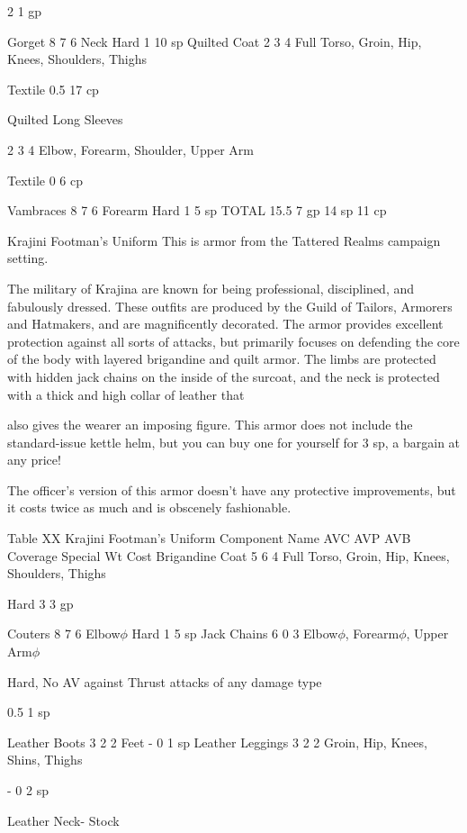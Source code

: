 \documentclass[oneside,11pt,english]{book}
\begin{document}
2 1 gp 

Gorget 8 7 6 Neck Hard 1 10 
sp 
Quilted Coat 2 3 4 Full Torso, Groin, Hip, 
Knees, Shoulders, Thighs 

Textile 0.5 17 
cp 

Quilted Long 
Sleeves 

2 3 4 Elbow, Forearm, Shoulder, 
Upper Arm 

Textile 0 6 cp 

Vambraces 8 7 6 Forearm Hard 1 5 sp 
TOTAL 15.5 7 gp 
14 
sp 
11 
cp 

 

Krajini Footman's Uniform 
This is armor from the Tattered Realms campaign setting. 

 

The military of Krajina are known for being professional, disciplined, and fabulously dressed. These 
outfits are produced by the Guild of Tailors, Armorers and Hatmakers, and are magnificently decorated. 
The armor provides excellent protection against all sorts of attacks, but primarily focuses on defending 
the core of the body with layered brigandine and quilt armor. The limbs are protected with hidden jack 
chains on the inside of the surcoat, and the neck is protected with a thick and high collar of leather that 


also gives the wearer an imposing figure. This armor does not include the standard-issue kettle helm, but 
you can buy one for yourself for 3 sp, a bargain at any price! 

 

The officer's version of this armor doesn't have any protective improvements, but it costs twice as much 
and is obscenely fashionable. 

 

Table XX Krajini Footman’s Uniform 
Component Name AVC AVP AVB Coverage Special Wt Cost 
Brigandine Coat 5 6 4 Full Torso, Groin, Hip, Knees, 
Shoulders, Thighs 

Hard 3 3 gp 

Couters 8 7 6 Elbow$\phi$ Hard 1 5 sp 
Jack Chains 6 0 3 Elbow$\phi$, Forearm$\phi$, Upper 
Arm$\phi$ 

Hard, No AV against Thrust 
attacks of any damage type 

0.5 1 sp 

Leather Boots 3 2 2 Feet - 0 1 sp 
Leather Leggings 3 2 2 Groin, Hip, Knees, Shins, 
Thighs 

- 0 2 sp 

Leather Neck-
Stock 
\end{document}
